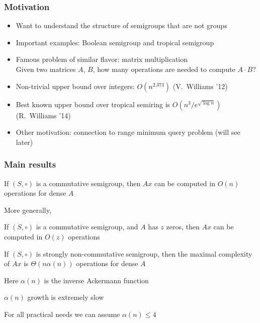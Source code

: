 \documentclass{beamer}
\begin{document}
\begin{frame}
\frametitle{Motivation}

\begin{itemize}[<+->]
\item Want to understand the structure of semigroups that are not groups
\item Important examples: Boolean semigroup and tropical semigroup
\item Famous problem of similar flavor: matrix multiplication \\
Given two matrices $A$, $B$, how many operations are needed to compute $A\cdot B$?
\item Non-trivial upper bound over integers: $O(n^{2.373})$ (V.~Williams '12)
\item Best known upper bound over tropical semiring is $O(n^3/e^{\sqrt{\log n}})$ (R.~Williams '14)
\item Other motivation: connection to range minimum query problem (will see later)
\end{itemize}


\end{frame}


\begin{frame}
\frametitle{Main results}

\begin{theorem}
If $(S,\circ)$ is a commutative semigroup, then $Ax$ can be computed in $O(n)$ operations for dense $A$
\end{theorem}

\pause

\medskip
More generally,
\vspace{-2mm}
\begin{theorem}
If $(S,\circ)$ is a commutative semigroup, and $A$ has $z$ zeros, then $Ax$ can be computed in $O(z)$ operations
\end{theorem}

\pause

\begin{theorem}
If $(S,\circ)$ is strongly non-commutative semigroup, then the maximal complexity of $Ax$ is $\Theta(n\alpha(n))$ operations for dense $A$
\end{theorem}

\medskip
Here $\alpha(n)$ is the inverse Ackermann function

\pause
\medskip
$\alpha(n)$ growth is extremely slow

\medskip
For all practical needs we can assume $\alpha(n)\leq 4$

\end{frame}
\end{document}

